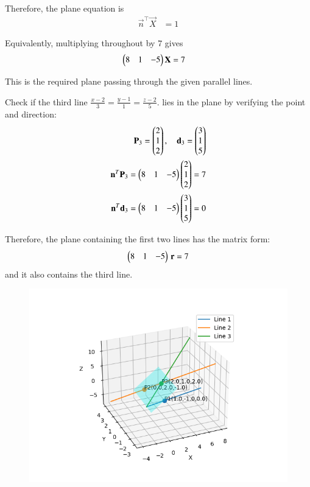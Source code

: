\documentclass[journal]{IEEEtran}
\begin{document}
\noindent
Therefore, the plane equation is
\begin{align}
\vec{n}^\top \vec{X} &= 1
\end{align}

\noindent
Equivalently, multiplying throughout by $7$ gives
\begin{align}
\begin{pmatrix}8 & 1 & -5\end{pmatrix}\mathbf{X} &= 7
\end{align}

\noindent
This is the required plane passing through the given parallel lines.


\noindent Check if the third line $\frac{x-2}{3} = \frac{y-1}{1} = \frac{z-2}{5}$. lies in the plane by verifying the point and direction:
\begin{align}
\mathbf{P}_3 = \begin{pmatrix}2\\1\\2\end{pmatrix}, \quad \mathbf{d}_3 = \begin{pmatrix}3\\1\\5\end{pmatrix} \\
\mathbf{n}^T \mathbf{P}_3 = \begin{pmatrix}8 & 1 & -5\end{pmatrix}\begin{pmatrix}2\\1\\2\end{pmatrix} = 7 \\
\mathbf{n}^T \mathbf{d}_3 = \begin{pmatrix}8 & 1 & -5\end{pmatrix}\begin{pmatrix}3\\1\\5\end{pmatrix} = 0
\end{align}

\noindent Therefore, the plane containing the first two lines has the matrix form:
\[
\begin{pmatrix}8 & 1 & -5\end{pmatrix}\,\mathbf{r} = 7
\]  
and it also contains the third line.


\begin{figure}[H]
    \centering
    \includegraphics[width=0.5\columnwidth]{figs/fig1.png}
    \caption{}
    \label{fig:placeholder}
\end{figure}
\end{document}
